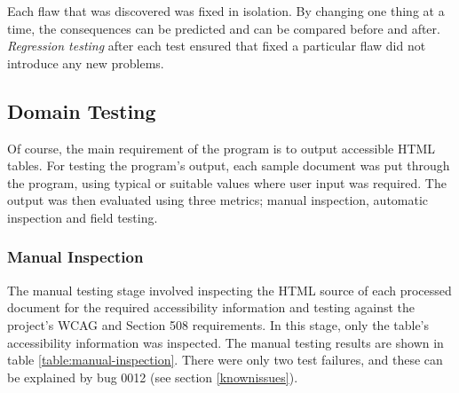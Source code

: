 Each flaw that was discovered was fixed in isolation. By changing one thing
at a time, the consequences can be predicted and can be compared before and 
after. \emph{Regression testing} after each test ensured that fixed a particular
flaw did not introduce any new problems.

\subsection{Domain Testing}

Of course, the main requirement of the program is to output accessible HTML
tables.  For testing the program's output, each sample document was put through
the program, using typical or suitable values where user input was required. The
output was then evaluated using three metrics; manual inspection, automatic
inspection and field testing. 

\subsubsection{Manual Inspection}

The manual testing stage involved inspecting the HTML source of each processed
document for the required accessibility information and testing against the
project's WCAG and Section 508 requirements. In this stage, only the table's
accessibility information was inspected. The manual testing results are shown
in table \ref{table:manual-inspection}. There were only two test failures, and
these can be explained by bug 0012 (see section \ref{knownissues}).

